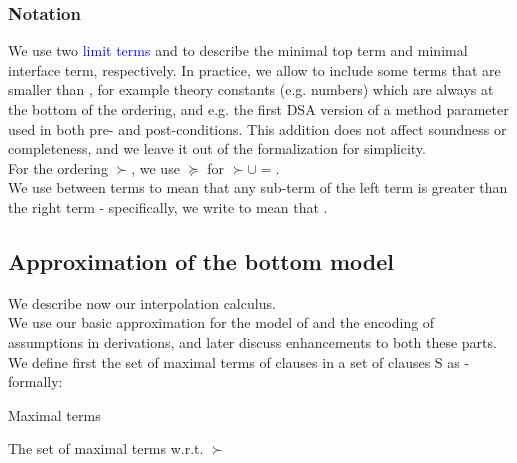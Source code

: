 \bigskip


\subsubsection*{Notation}
We use two \textcolor{blue}{limit terms} \m{\textcolor{blue}{l^t}} and \m{\textcolor{blue}{l^b}} to describe the minimal top term and minimal interface term, respectively. In practice, we allow  to include some terms that are smaller than , for example  theory constants (e.g. numbers) which are always at the bottom of the ordering, and e.g. the first DSA version of a method parameter used in both pre- and post-conditions. This addition does not affect soundness or completeness, and we leave it out of the formalization for simplicity.\\
For the ordering $\succ$, we use $\succeq$ for $\succ \cup =$. \\
We use \m{\textcolor{blue}{\curlyeqsucc}} between terms to mean that any sub-term of the left term is greater than the right term - specifically, we write  to mean that .

\subsection{Approximation of the bottom model}
We describe now our interpolation calculus.\\
We use our basic approximation \m{=_{\Gamma}} for the model of  and the encoding of assumptions in derivations, and later discuss enhancements to both these parts.\\
We define first the set of maximal terms of clauses in a set of clauses S as  - formally:
\begin{definition}{Maximal terms}

\noindent
The set of maximal terms w.r.t. $\succ$\\
\\

\label{def_maxTerms}
\end{definition}


